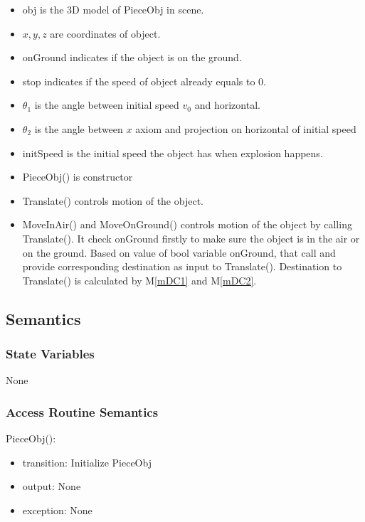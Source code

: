 \documentclass[12pt, titlepage]{article}
\newcommand{\mref}[1]{M\ref{#1}}
\begin{document}
\noindent
\begin{itemize}
	\item obj is the 3D model of PieceObj in scene. 	
	\item $x,y,z$ are coordinates of object.	
	\item onGround indicates if the object is on the ground.
	\item stop indicates if the speed of object already equals to 0. 
	\item $\theta_{1}$ is the angle between initial speed $v_{0}$ and horizontal.
	\item $\theta_{2}$ is the angle between $x$ axiom and projection on horizontal of initial speed
	\item initSpeed is the initial speed the object has when explosion happens.
	\item PieceObj() is constructor
	\item Translate() controls motion of the object.
	\item  MoveInAir() and MoveOnGround() controls motion of the object by calling Translate(). It check onGround firstly to make sure the object is in the air or on the ground. Based on value of bool variable onGround, that call and provide corresponding destination as input to Translate(). Destination to Translate() is calculated by \mref{mDC1} and \mref{mDC2}. \\
\end{itemize}

\subsection{Semantics}

\subsubsection{State Variables}

None

\subsubsection{Access Routine Semantics}

\noindent PieceObj(): \an{use \mref{mIF} here}
\begin{itemize}
	\item transition: Initialize PieceObj
	\item output: None
	\item exception: None
\end{itemize}
\end{document}

